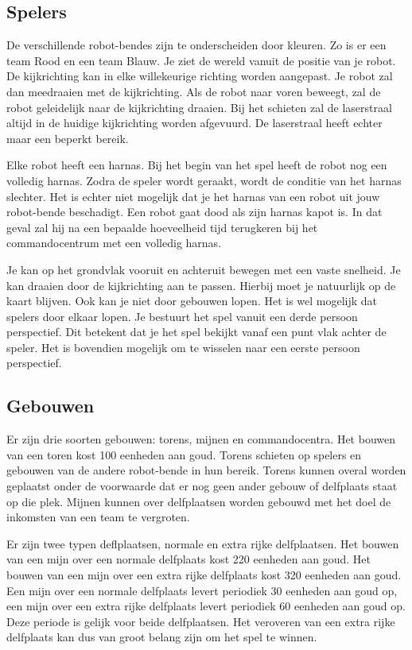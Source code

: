     \subsection{Spelers}
    De verschillende robot-bendes zijn te onderscheiden door kleuren. Zo is er een team Rood en een team Blauw. Je ziet de wereld vanuit de positie van je robot. De kijkrichting kan in elke willekeurige richting worden aangepast. Je robot zal dan meedraaien met de kijkrichting. Als de robot naar voren beweegt, zal de robot geleidelijk naar de kijkrichting draaien. Bij het schieten zal de laserstraal altijd in de huidige kijkrichting worden afgevuurd. De laserstraal heeft echter maar een beperkt bereik.

    Elke robot heeft een harnas. Bij het begin van het spel heeft de robot nog een volledig harnas. Zodra de speler wordt geraakt, wordt de conditie van het harnas slechter. Het is echter niet mogelijk dat je het harnas van een robot uit jouw robot-bende beschadigt. Een robot gaat dood als zijn harnas kapot is. In dat geval zal hij na een bepaalde hoeveelheid tijd terugkeren bij het commandocentrum met een volledig harnas.

    Je kan op het grondvlak vooruit en achteruit bewegen met een vaste snelheid. Je kan draaien door de kijkrichting aan te passen. Hierbij moet je natuurlijk op de kaart blijven. Ook kan je niet door gebouwen lopen. Het is wel mogelijk dat spelers door elkaar lopen. Je bestuurt het spel vanuit een derde persoon perspectief. Dit betekent dat je het spel bekijkt vanaf een punt vlak achter de speler. Het is bovendien mogelijk om te wisselen naar een eerste persoon perspectief.

    \subsection{Gebouwen}
    Er zijn drie soorten gebouwen: torens, mijnen en commandocentra. Het bouwen van een toren kost 100 eenheden aan goud. Torens schieten op spelers en gebouwen van de andere robot-bende in hun bereik. Torens kunnen overal worden geplaatst onder de voorwaarde dat er nog geen ander gebouw of delfplaats staat op die plek. Mijnen kunnen over delfplaatsen worden gebouwd met het doel de inkomsten van een team te vergroten.

    Er zijn twee typen deflplaatsen, normale en extra rijke delfplaatsen. Het bouwen van een mijn over een normale delfplaats kost 220 eenheden aan goud. Het bouwen van een mijn over een extra rijke delfplaats kost 320 eenheden aan goud. Een mijn over een normale delfplaats levert periodiek 30 eenheden aan goud op, een mijn over een extra rijke delfplaats levert periodiek 60 eenheden aan goud op. Deze periode is gelijk voor beide delfplaatsen. Het veroveren van een extra rijke delfplaats kan dus van groot belang zijn om het spel te winnen. 

